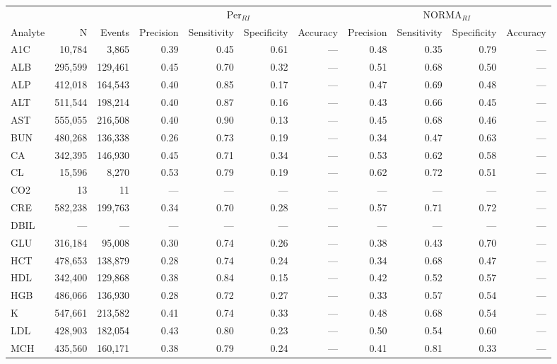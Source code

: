\begin{table}[ht]
\centering
\footnotesize
\begin{tabular}{lrrrrrrrrrr}
\toprule
 & &  & \multicolumn{4}{c}{Per$_{RI}$} & \multicolumn{4}{c}{NORMA$_{RI}$} \\
\cmidrule(lr){4-7} \cmidrule(lr){8-11}
Analyte & N & Events & Precision & Sensitivity & Specificity & Accuracy & Precision & Sensitivity & Specificity & Accuracy \\
\midrule
A1C & 10,784 & 3,865 & 0.39 & 0.45 & 0.61 & --- & 0.48 & 0.35 & 0.79 & --- \\
ALB & 295,599 & 129,461 & 0.45 & 0.70 & 0.32 & --- & 0.51 & 0.68 & 0.50 & --- \\
ALP & 412,018 & 164,543 & 0.40 & 0.85 & 0.17 & --- & 0.47 & 0.69 & 0.48 & --- \\
ALT & 511,544 & 198,214 & 0.40 & 0.87 & 0.16 & --- & 0.43 & 0.66 & 0.45 & --- \\
AST & 555,055 & 216,508 & 0.40 & 0.90 & 0.13 & --- & 0.45 & 0.68 & 0.46 & --- \\
BUN & 480,268 & 136,338 & 0.26 & 0.73 & 0.19 & --- & 0.34 & 0.47 & 0.63 & --- \\
CA & 342,395 & 146,930 & 0.45 & 0.71 & 0.34 & --- & 0.53 & 0.62 & 0.58 & --- \\
CL & 15,596 & 8,270 & 0.53 & 0.79 & 0.19 & --- & 0.62 & 0.72 & 0.51 & --- \\
CO2 & 13 & 11 & --- & --- & --- & --- & --- & --- & --- & --- \\
CRE & 582,238 & 199,763 & 0.34 & 0.70 & 0.28 & --- & 0.57 & 0.71 & 0.72 & --- \\
DBIL & --- & --- & --- & --- & --- & --- & --- & --- & --- & --- \\
GLU & 316,184 & 95,008 & 0.30 & 0.74 & 0.26 & --- & 0.38 & 0.43 & 0.70 & --- \\
HCT & 478,653 & 138,879 & 0.28 & 0.74 & 0.24 & --- & 0.34 & 0.68 & 0.47 & --- \\
HDL & 342,400 & 129,868 & 0.38 & 0.84 & 0.15 & --- & 0.42 & 0.52 & 0.57 & --- \\
HGB & 486,066 & 136,930 & 0.28 & 0.72 & 0.27 & --- & 0.33 & 0.57 & 0.54 & --- \\
K & 547,661 & 213,582 & 0.41 & 0.74 & 0.33 & --- & 0.48 & 0.68 & 0.54 & --- \\
LDL & 428,903 & 182,054 & 0.43 & 0.80 & 0.23 & --- & 0.50 & 0.54 & 0.60 & --- \\
MCH & 435,560 & 160,171 & 0.38 & 0.79 & 0.24 & --- & 0.41 & 0.81 & 0.33 & --- \\

\end{tabular}
\end{table}
